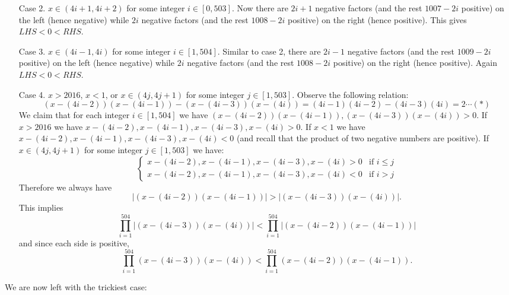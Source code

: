\documentclass[11pt,a4paper]{article}
\begin{document}
\begin{itemize}
\begin{itemize}
\item [Case 2.] $x\in (4i+1, 4i+2)$ for some integer $i\in [0, 503]$. 
Now there are $2i+1$ negative factors (and the rest $1007-2i$ positive) on the left (hence negative) while $2i$ negative factors (and the rest $1008-2i$ positive) on the right (hence positive). This gives $LHS<0<RHS$.

\item [Case 3.] $x\in (4i-1, 4i)$ for some integer $i\in [1, 504]$. 
Similar to case 2, there are $2i-1$ negative factors (and the rest $1009-2i$ positive) on the left (hence negative) while $2i$ negative factors (and the rest $1008-2i$ positive) on the right (hence positive). 
Again $LHS<0<RHS$. 

\item [Case 4.] $x>2016$, $x<1$, or $x\in (4j, 4j+1)$ for some integer $j\in [1, 503]$. 
Observe the following relation:
$$(x-(4i-2))(x-(4i-1))-(x-(4i-3))(x-(4i))=(4i-1)(4i-2)-(4i-3)(4i)=2\cdots (*)$$ 
We claim that for each integer $i\in [1, 504]$ we have 
$(x-(4i-2))(x-(4i-1)), (x-(4i-3))(x-(4i))>0$. 
If $x>2016$ we have $x-(4i-2), x-(4i-1), x-(4i-3), x-(4i) >0$. 
If $x<1$ we have $x-(4i-2), x-(4i-1), x-(4i-3), x-(4i) <0$ (and recall that the product of two negative numbers are positive). 
If $x\in (4j, 4j+1)$ for some integer $j\in [1, 503]$ we have: 
$$\begin{cases} 
x-(4i-2), x-(4i-1), x-(4i-3), x-(4i) >0 & \text{if } i\le j \\ 
x-(4i-2), x-(4i-1), x-(4i-3), x-(4i) <0 & \text{if } i > j 
\end{cases} $$
Therefore we always have 
$$|(x-(4i-2))(x-(4i-1))|>|(x-(4i-3))(x-(4i))|.$$ 
This implies 
$$\displaystyle\prod_{i=1}^{504} |(x-(4i-3))(x-(4i))|<\displaystyle\prod_{i=1}^{504} |(x-(4i-2))(x-(4i-1))|$$ 
and since each side is positive, 
$$\displaystyle\prod_{i=1}^{504} (x-(4i-3))(x-(4i))<\displaystyle\prod_{i=1}^{504} (x-(4i-2))(x-(4i-1)).$$ 
\end{itemize}

We are now left with the trickiest case: 
\begin{itemize}


\end{itemize}
\end{itemize}
\end{document}
